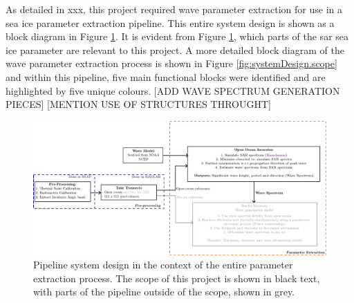 As detailed in xxx, this project required wave parameter extraction for use in a sea ice parameter extraction pipeline. This entire system design is shown as a block diagram in Figure \ref{fig:systemDesign.wholeProject}. It is evident from Figure \ref{fig:systemDesign.wholeProject}, which parts of the \acs{sar} sea ice parameter are relevant to this project. A more detailed block diagram of the wave parameter extraction process is shown in Figure \ref{fig:systemDesign.scope} and within this pipeline, five main functional blocks were identified and are highlighted by five unique colours. [ADD WAVE SPECTRUM GENERATION PIECES] [MENTION USE OF STRUCTURES THROUGHT]
\begin{figure}[H]
    \centering
    \includegraphics[width=.95\linewidth]{Figures/PipelineDesign/overall_project.pdf}
    \caption{Pipeline system design in the context of the entire parameter extraction process. The scope of this project is shown in black text, with parts of the pipeline outside of the scope, shown in grey.}
    \label{fig:systemDesign.wholeProject}
\end{figure}

